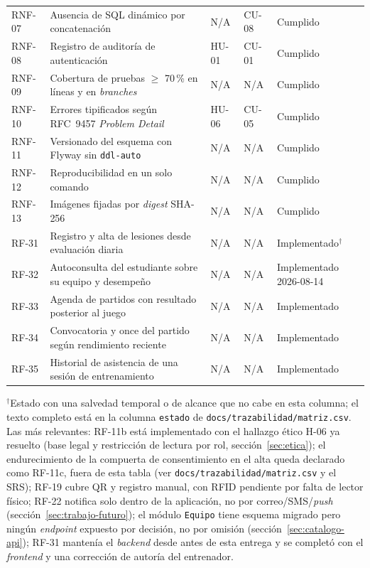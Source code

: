 \documentclass[11pt,a4paper]{article}
\newcommand{\ruta}[1]{\texttt{\footnotesize #1}}
\begin{document}
\begin{longtable}{@{}p{1.5cm}p{6.3cm}p{1.4cm}p{1.4cm}p{2.1cm}@{}}
RNF-07 & Ausencia de SQL dinámico por concatenación & N/A & CU-08 & Cumplido \\
RNF-08 & Registro de auditoría de autenticación & HU-01 & CU-01 & Cumplido \\
RNF-09 & Cobertura de pruebas $\geq$ 70\,\% en líneas y en \emph{branches} & N/A & N/A & Cumplido \\
RNF-10 & Errores tipificados según RFC~9457 \emph{Problem Detail} & HU-06 & CU-05 & Cumplido \\
RNF-11 & Versionado del esquema con Flyway sin \texttt{ddl-auto} & N/A & N/A & Cumplido \\
RNF-12 & Reproducibilidad en un solo comando & N/A & N/A & Cumplido \\
RNF-13 & Imágenes fijadas por \emph{digest} SHA-256 & N/A & N/A & Cumplido \\
RF-31 & Registro y alta de lesiones desde evaluación diaria & N/A & N/A & Implementado$^\dagger$ \\
RF-32 & Autoconsulta del estudiante sobre su equipo y desempeño & N/A & N/A & Implementado 2026-08-14 \\
RF-33 & Agenda de partidos con resultado posterior al juego & N/A & N/A & Implementado \\
RF-34 & Convocatoria y once del partido según rendimiento reciente & N/A & N/A & Implementado \\
RF-35 & Historial de asistencia de una sesión de entrenamiento & N/A & N/A & Implementado \\
\bottomrule
\end{longtable}
\normalsize

$^\dagger$Estado con una salvedad temporal o de alcance que no cabe en
esta columna; el texto completo está en la columna \texttt{estado} de
\ruta{docs/trazabilidad/matriz.csv}. Las más relevantes: RF-11b está
implementado con el hallazgo ético H-06 ya resuelto (base legal y
restricción de lectura por rol, sección~\ref{sec:etica}); el
endurecimiento de la compuerta de consentimiento en el alta queda
declarado como RF-11c, fuera de esta tabla (ver
\ruta{docs/trazabilidad/matriz.csv} y el SRS); RF-19 cubre QR y registro
manual, con RFID pendiente por falta de lector físico; RF-22 notifica
solo dentro de la aplicación, no por correo/SMS/\emph{push}
(sección~\ref{sec:trabajo-futuro}); el módulo \texttt{Equipo} tiene
esquema migrado pero ningún \emph{endpoint} expuesto por decisión, no
por omisión (sección~\ref{sec:catalogo-api}); RF-31 mantenía el
\emph{backend} desde antes de esta entrega y se completó con el
\emph{frontend} y una corrección de autoría del entrenador.
\end{document}
